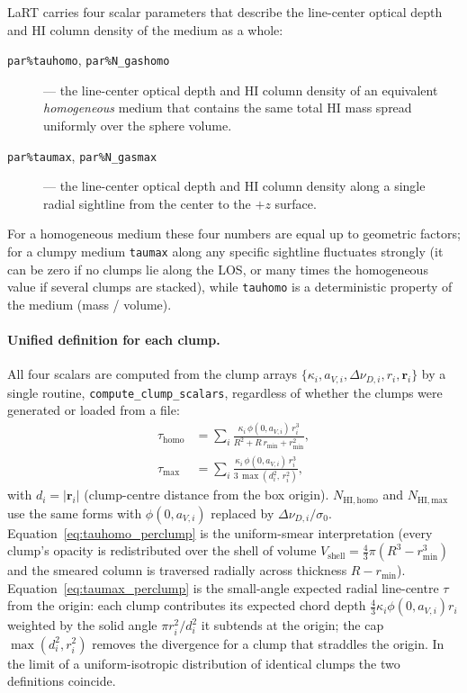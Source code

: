 \documentclass[english,a4paper]{my_memo}
\begin{document}
LaRT carries four scalar parameters that describe the line-center
optical depth and HI column density of the medium as a whole:
\begin{description}
\item[\texttt{par\%tauhomo}, \texttt{par\%N\_gashomo}] — the line-center
  optical depth and HI column density of an equivalent
  \emph{homogeneous} medium that contains the same total HI mass spread
  uniformly over the sphere volume.
\item[\texttt{par\%taumax}, \texttt{par\%N\_gasmax}] — the line-center
  optical depth and HI column density along a single radial sightline
  from the center to the $+z$ surface.
\end{description}
For a homogeneous medium these four numbers are equal up to geometric
factors; for a clumpy medium \texttt{taumax} along any specific sightline
fluctuates strongly (it can be zero if no clumps lie along the LOS, or
many times the homogeneous value if several clumps are stacked), while
\texttt{tauhomo} is a deterministic property of the medium (mass / volume).

\paragraph{Unified definition for each clump.}
\label{par:compute_clump_scalars}
All four scalars are computed from the clump arrays
$\{\kappa_i, a_{V,i}, \Delta\nu_{D,i}, r_i, \mathbf{r}_i\}$ by a single
routine, \texttt{compute\_clump\_scalars}, regardless of whether the
clumps were generated or loaded from a file:
\begin{align}
  \tau_\mathrm{homo}
    &= \sum_i \frac{\kappa_i\,\phi(0,a_{V,i})\,r_i^3}
                   {R^2 + R\,r_\mathrm{min} + r_\mathrm{min}^2},
  \label{eq:tauhomo_perclump} \\
  \tau_\mathrm{max}
    &= \sum_i \frac{\kappa_i\,\phi(0,a_{V,i})\,r_i^3}
                   {3\,\max(d_i^2,\,r_i^2)},
  \label{eq:taumax_perclump}
\end{align}
with $d_i = |\mathbf{r}_i|$ (clump-centre distance from the box origin).
$N_\mathrm{HI,homo}$ and $N_\mathrm{HI,max}$ use the same forms with
$\phi(0,a_{V,i})$ replaced by $\Delta\nu_{D,i}/\sigma_0$.
Equation~\eqref{eq:tauhomo_perclump} is the uniform-smear interpretation
(every clump's opacity is redistributed over the shell of volume
$V_\mathrm{shell}=\tfrac{4}{3}\pi(R^3-r_\mathrm{min}^3)$ and the smeared
column is traversed radially across thickness $R-r_\mathrm{min}$).
Equation~\eqref{eq:taumax_perclump} is the small-angle expected radial
line-centre $\tau$ from the origin: each clump contributes its expected
chord depth $\tfrac{4}{3}\kappa_i\phi(0,a_{V,i})r_i$ weighted by the solid
angle $\pi r_i^2/d_i^2$ it subtends at the origin; the cap
$\max(d_i^2,r_i^2)$ removes the divergence for a clump that straddles the
origin.  In the limit of a uniform-isotropic distribution of identical
clumps the two definitions coincide.
\end{document}
